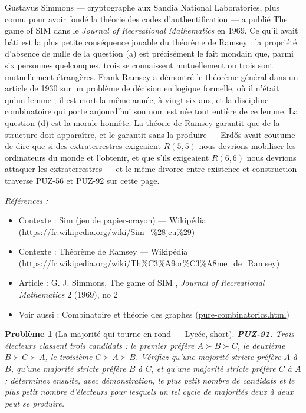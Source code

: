 \documentclass[11pt]{article}
\newtheorem{problem}{Problème}
\newenvironment{refs}{\par\small\noindent\emph{Références :}\begin{itemize}\setlength\itemsep{0pt}}{\end{itemize}\normalsize}
\begin{document}
\noindent Gustavus Simmons --- cryptographe aux Sandia National Laboratories, plus
connu pour avoir fondé la théorie des codes d'authentification --- a publié \og{} The game of SIM \fg{}
dans le \textit{Journal of Recreational Mathematics} en 1969. Ce qu'il avait bâti est la plus
petite conséquence jouable du théorème de Ramsey : la propriété d'absence de nulle de la
question (a) est précisément le fait mondain que, parmi six personnes quelconques, trois se
connaissent mutuellement ou trois sont mutuellement étrangères. Frank Ramsey a démontré le
théorème général dans un article de 1930 sur un problème de décision en logique formelle, où
il n'était qu'un lemme ; il est mort la même année, à vingt-six ans, et la discipline
combinatoire qui porte aujourd'hui son nom est née tout entière de ce lemme. La question (d)
est la morale honnête. La théorie de Ramsey garantit que de la structure doit apparaître, et
le garantit sans la produire --- Erd\H{o}s avait coutume de dire que si des extraterrestres
exigeaient $ R(5,5) $ nous devrions mobiliser les ordinateurs du monde et l'obtenir, et
que s'ils exigeaient $ R(6,6) $ nous devrions attaquer les extraterrestres --- et le même
divorce entre existence et construction traverse PUZ-56 et PUZ-92 sur cette page.

\begin{refs}
\item Contexte : Sim (jeu de papier-crayon) --- Wikipédia (\url{https://fr.wikipedia.org/wiki/Sim_%28jeu%29})
\item Contexte : Théorème de Ramsey --- Wikipédia (\url{https://fr.wikipedia.org/wiki/Th%C3%A9or%C3%A8me_de_Ramsey})
\item Article : G. J. Simmons, \og{} The game of SIM \fg{}, \textit{Journal of Recreational Mathematics} 2 (1969), no 2
\item Voir aussi : Combinatoire et théorie des graphes (\url{pure-combinatorics.html})
\end{refs}

\bigskip

\begin{problem}[{La majorité qui tourne en rond --- Lycée, short}]
\textbf{PUZ-91.} Trois électeurs classent trois candidats : le premier
préfère $ A \succ B \succ C $, le deuxième $ B \succ C \succ A $, le troisième
$ C \succ A \succ B $. Vérifiez qu'une majorité stricte préfère $ A $ à $ B $, qu'une
majorité stricte préfère $ B $ à $ C $, et qu'une majorité stricte préfère $ C $ à
$ A $ ; déterminez ensuite, avec démonstration, le plus petit nombre de candidats et le
plus petit nombre d'électeurs pour lesquels un tel cycle de majorités deux à deux peut se
produire.
\end{problem}
\end{document}
